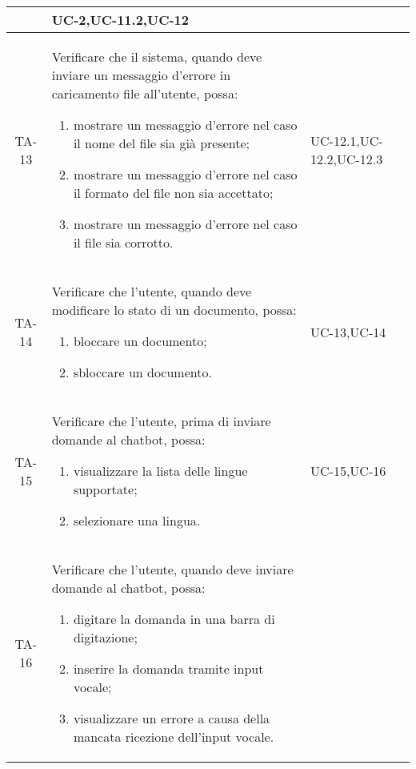 \begin{xltabular}{\textwidth}{| c | X | X | c |}
\begin{enumerate}
    \end{enumerate}& UC-2,\newline UC-11.2,\newline UC-12 & \textcolor{xmarkcolor}{} \\
    \hline
     TA-13 & Verificare che il sistema, quando deve inviare un messaggio d'errore in caricamento file all'utente, possa:
    \begin{enumerate}
        \item mostrare un messaggio d'errore nel caso il nome del file sia già presente;
        \item mostrare un messaggio d'errore nel caso il formato del file non sia accettato;
        \item mostrare un messaggio d'errore nel caso il file sia corrotto.
        
    \end{enumerate}& UC-12.1,\newline UC-12.2,\newline UC-12.3 & \textcolor{xmarkcolor}{} \\
    \hline

    TA-14 & Verificare che l’utente, quando deve modificare lo stato di un documento, possa:
    \begin{enumerate}
        \item bloccare un documento;
        \item sbloccare un documento.
        
    \end{enumerate}& UC-13,\newline UC-14 & \textcolor{xmarkcolor}{} \\
    \hline
    
    TA-15 & Verificare che l’utente, prima di inviare domande al chatbot, possa:
    \begin{enumerate}
        \item visualizzare la lista delle lingue supportate;
        \item selezionare una lingua.
        
    \end{enumerate}& UC-15,\newline UC-16 & \textcolor{xmarkcolor}{} \\
    \hline

    TA-16 & Verificare che l’utente, quando deve inviare domande al chatbot, possa:
    \begin{enumerate}
        \item digitare la domanda in una barra di digitazione;
        \item inserire la domanda tramite input vocale;
        \item visualizzare un errore a causa della mancata ricezione dell'input vocale.
        

\end{enumerate}
\end{xltabular}
